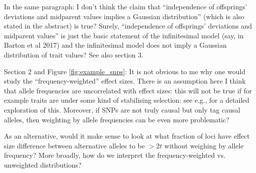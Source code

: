 
\begin{point}{\revref}
In the same paragraph: I don't think the claim that ``independence of offsprings' deviations and midparent values implies a Gaussian distribution'' (which is also stated in the abstract) is true? Surely, ``independence of offsprings' deviations and midparent values'' is just the basic statement of the infinitesimal model (say, in Barton et al 2017) and the infinitesimal model does not imply a Gaussian distribution of trait values? See also section 3.
\end{point}


\begin{point}{}
    Section 2 and Figure \ref{fig:example_snps}: It is not obvious to me why one would study the ``frequency-weighted'' effect sizes. There is an assumption here I think that allele frequencies are uncorrelated with effect sizes: this will not be true if for example traits are under some kind of stabilising selection: see e.g., \citet{simons2018population} for a detailed exploration of this. Moreover, if SNPs are not truly causal but only tag causal alleles, then weighting by allele frequencies can be even more problematic?

As an alternative, would it make sense to look at what fraction of loci have effect size difference between alternative alleles to be $>2t$ without weighing by allele frequency?
More broadly, how do we interpret the frequency-weighted vs. unweighted distributions?
\end{point}


